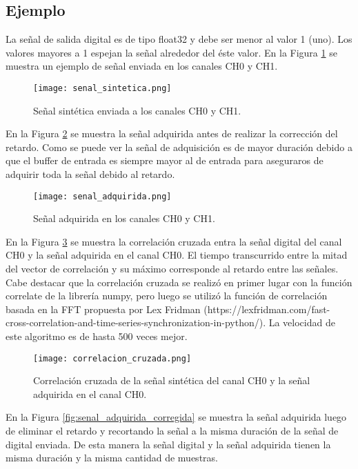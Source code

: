 \documentclass[a4paper, 11pt]{article}
\begin{document}
\subsection*{Ejemplo}
La señal de salida digital es de tipo float32 y debe ser menor al valor 1 (uno). Los valores mayores a 1 espejan la señal alrededor del éste valor. En la Figura \ref{fig:senal_sintetica} se muestra un ejemplo de señal enviada en los canales CH0 y CH1. 

\begin{figure} [H]
\centering
\texttt{[image: senal\_sintetica.png]}
\caption{Señal sintética enviada a los canales CH0 y CH1. \label{fig:senal_sintetica}}
\end{figure} 

En la Figura \ref{fig:senal_adquirida} se muestra la señal adquirida antes de realizar la corrección del retardo. Como se puede ver la señal de adquisición es de mayor duración debido a que el buffer de entrada es siempre mayor al de entrada para aseguraros de adquirir toda la señal debido al retardo.


\begin{figure} [H]
\centering
\texttt{[image: senal\_adquirida.png]}
\caption{Señal adquirida en los canales CH0 y CH1. \label{fig:senal_adquirida}}
\end{figure} 

En la Figura \ref{fig:correlacion_cruzada} se muestra la correlación cruzada entra la señal digital del canal CH0 y la señal adquirida en el canal CH0. El tiempo transcurrido entre la mitad del vector de correlación y su máximo corresponde al retardo entre las señales. Cabe destacar que la correlación cruzada se realizó en primer lugar con la función correlate de la librería numpy, pero luego se utilizó la función de correlación basada en la FFT propuesta por Lex Fridman (https://lexfridman.com/fast-cross-correlation-and-time-series-synchronization-in-python/). La velocidad de este algoritmo es de hasta 500 veces mejor. 
 
\begin{figure} [H]
\centering
\texttt{[image: correlacion\_cruzada.png]}
\caption{Correlación cruzada de la señal sintética del canal CH0 y la señal adquirida en el canal CH0.\label{fig:correlacion_cruzada}}
\end{figure} 

En la Figura \ref{fig:senal_adquirida_corregida} se muestra la señal adquirida luego de eliminar el retardo y recortando la señal a la misma duración de la señal de digital enviada. De esta manera la señal digital y la señal adquirida tienen la misma duración y la misma cantidad de muestras.
 
\end{document}

